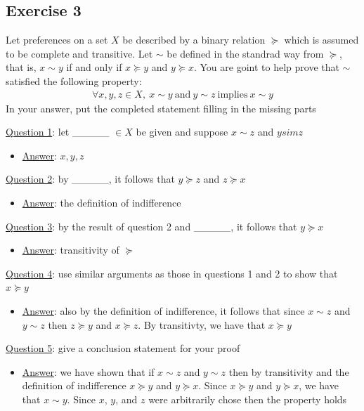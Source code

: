 \documentclass{article}
\begin{document}
\subsection{Exercise 3}
Let preferences on a set $X$ be described by a binary relation $\succeq$ which is assumed to be complete and transitive. Let $\sim$ be defined in the standrad way from $\succeq$, that is, $x \sim y$ if and only if $x \succeq y$ and $y \succeq x$. You are goint to help prove that $\sim$ satisfied the following property:
\begin{gather*}
  \forall x,y,z \in X, \ x \sim y \ \text{and} \ y \sim z \ \text{implies} \ x \sim y
\end{gather*}
In your answer, put the completed statement filling in the missing parts
 \par \vspace{0.3em}
  \underline{Question 1}: let \_\_\_\_\_ $\in X$ be given and suppose $x \sim z$ and $y sim z$
  \begin{itemize}
    \item  \underline{Answer}: $x,y,z$
  \end{itemize}
  \par
  \underline{Question 2}: by \_\_\_\_\_, it follows that $y \succeq z$ and $z \succeq x$
  \begin{itemize}
    \item  \underline{Answer}: the definition of indifference
  \end{itemize}
  \par
  \underline{Question 3}: by the result of question 2 and \_\_\_\_\_, it follows that $y \succeq x$
  \begin{itemize}
    \item  \underline{Answer}: transitivity of $\succeq$
  \end{itemize}
  \par
  \underline{Question 4}: use similar arguments as those in questions 1 and 2 to show that $x \succeq y$
  \begin{itemize}
    \item  \underline{Answer}: also by the definition of indifference, it follows that since $x \sim z$ and $y \sim z$ then $z \succeq y$ and $x \succeq z$. By transitivty, we have that $x \succeq y$
  \end{itemize}
  \par
  \underline{Question 5}: give a conclusion statement for your proof
  \begin{itemize}
    \item  \underline{Answer}: we have shown that if $x \sim z$ and $y \sim z$ then by transitivity and the definition of indifference $x \succeq y$ and $y \succeq x$. Since $x \succeq y$ and $y \succeq x$, we have that $x \sim y$. Since $x$, $y$, and $z$ were arbitrarily chose then the property holds
  \end{itemize}
\end{document}
